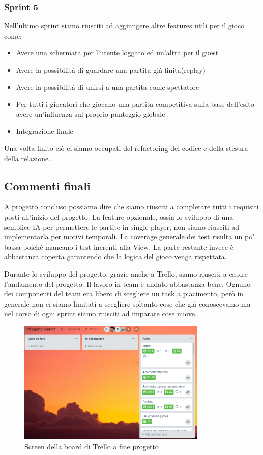 \subsubsection{Sprint 5}
Nell’ultimo sprint siamo riusciti ad aggiungere altre features utili per il gioco come: 
 \begin {itemize}
  \item Avere una schermata per l’utente loggato ed un’altra per il guest
  \item Avere la possibilità di guardare una partita già finita(replay)
  \item Avere la possibilità di unirsi a una partita come spettatore
  \item Per tutti i giocatori che giocano una partita competitiva sulla base dell'esito avere un'influenza sul proprio punteggio globale
  \item Integrazione finale
\end {itemize} 

Una volta finito ciò ci siamo occupati del refactoring del codice e della stesura della relazione.
\bigskip
\subsection{Commenti finali}

A progetto concluso possiamo dire che siamo riusciti a completare tutti i requisiti posti all’inizio del progetto. La feature opzionale, ossia lo sviluppo di una semplice IA per permettere le partite in single-player, non siamo riusciti ad implementarla per motivi temporali.
La coverage generale dei test risulta un po’ bassa poiché mancano i test inerenti alla View. La parte restante invece è abbastanza coperta garantendo che la logica del gioco venga rispettata.

Durante lo sviluppo del progetto, grazie anche a Trello, siamo riusciti a capire l’andamento del progetto. Il lavoro in team è andato abbastanza bene. Ognuno dei componenti del team era libero di scegliere un task a piacimento, però in generale non ci siamo limitati a scegliere soltanto cose che già conoscevamo ma nel corso di ogni sprint siamo riusciti ad imparare cose nuove. 

\begin{figure}[h!]
 \centering
  \includegraphics[width=0.8\textwidth]{trello.png}
   \caption{Screen della board di Trello a fine progetto }
\end{figure}


